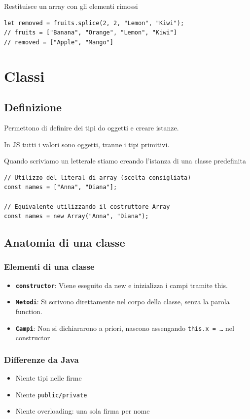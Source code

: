 \begin{itemize}
    Restituisce un array con gli elementi rimossi
    \begin{lstlisting}
let removed = fruits.splice(2, 2, "Lemon", "Kiwi");
// fruits = ["Banana", "Orange", "Lemon", "Kiwi"]
// removed = ["Apple", "Mango"]
    \end{lstlisting}
\end{itemize}

\section{Classi}
\subsection{Definizione}
Permettono di definire dei tipi do oggetti e creare istanze.

In JS tutti i valori sono oggetti, tranne i tipi primitivi.

Quando scriviamo un letterale stiamo creando l'istanza di una classe predefinita
\begin{lstlisting}
// Utilizzo del literal di array (scelta consigliata)
const names = ["Anna", "Diana"];

// Equivalente utilizzando il costruttore Array
const names = new Array("Anna", "Diana");
\end{lstlisting}

\subsection{Anatomia di una classe}
\subsubsection{Elementi di una classe}
\begin{itemize}
    \item \textbf{\texttt{constructor}}: Viene eseguito da new e inizializza i campi tramite this.
    \item \textbf{\texttt{Metodi}}: Si scrivono direttamente nel corpo della classe, senza la parola function.
    \item \textbf{\texttt{Campi}}: Non si dichiararono a priori, nascono assengando \texttt{this.x = \dots} nel constructor
\end{itemize}

\subsubsection{Differenze da Java}
\begin{itemize}
    \item Niente tipi nelle firme
    \item Niente \texttt{public/private} 
    \item Niente overloading: una sola firma per nome
\end{itemize}

